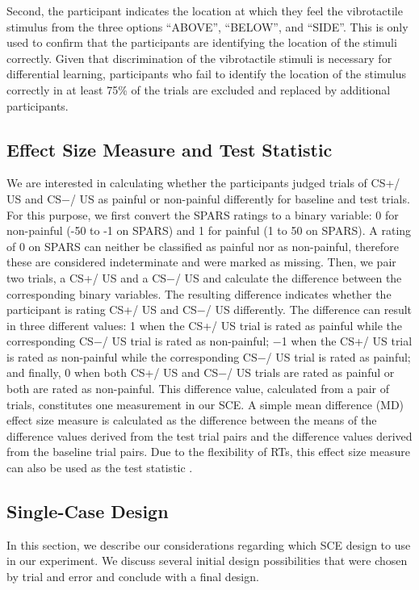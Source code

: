 \documentclass{jote-article}
\begin{document}
Second, the participant indicates the location at which they feel the vibrotactile stimulus from the three options “ABOVE”, “BELOW”, and “SIDE”. This is only used to confirm that the participants are identifying the location of the stimuli correctly. Given that discrimination of the vibrotactile stimuli is necessary for differential learning, participants who fail to identify the location of the stimulus correctly in at least 75\% of the trials are excluded and replaced by additional participants.

\subsection{Effect Size Measure and Test Statistic}

We are interested in calculating whether the participants judged trials of CS+/ US and CS−/ US as painful or non-painful differently for baseline and test trials. For this purpose, we first convert the SPARS ratings to a binary variable: 0 for non-painful (-50 to -1 on SPARS) and 1 for painful (1 to 50 on SPARS). A rating of 0 on SPARS can neither be classified as painful nor as non-painful, therefore these are considered indeterminate and were marked as missing. Then, we pair two trials, a CS+/ US and a CS−/ US and calculate the difference between the corresponding binary variables. The resulting difference indicates whether the participant is rating CS+/ US and CS−/ US differently. The difference can result in three different values: 1 when the CS+/ US trial is rated as painful while the corresponding CS−/ US trial is rated as non-painful; −1 when the CS+/ US trial is rated as non-painful while the corresponding CS−/ US trial is rated as painful; and finally, 0 when both CS+/ US and CS−/ US trials are rated as painful or both are rated as non-painful. This difference value, calculated from a pair of trials, constitutes one measurement in our SCE. A simple mean difference (MD) effect size measure is calculated as the difference between the means of the difference values derived from the test trial pairs and the difference values derived from the baseline trial pairs. Due to the flexibility of RTs, this effect size measure can also be used as the test statistic \cite{bibr31}.

\subsection{Single-Case Design}

In this section, we describe our considerations regarding which SCE design to use in our experiment. We discuss several initial design possibilities that were chosen by trial and error and conclude with a final design.
\end{document}
